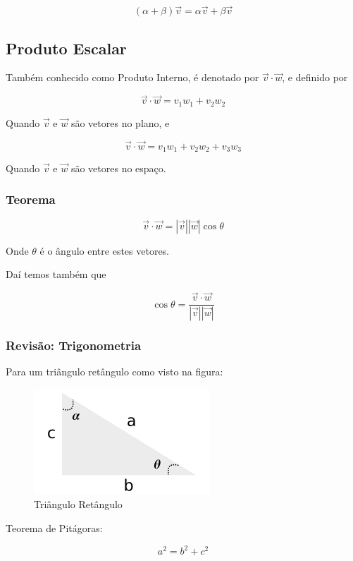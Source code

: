\[
(\alpha + \beta) \vec{v} = \alpha \vec{v} + \beta \vec{v}
\]

\subsection{Produto Escalar}\label{produto-escalar}

Também conhecido como Produto Interno, é denotado por
$\vec{v} \cdot \vec{w}$, e definido por

\[
\vec{v} \cdot \vec{w} = v_1 w_1 + v_2 w_2
\]

Quando $\vec{v}$ e $\vec{w}$ são vetores no plano, e

\[
\vec{v} \cdot \vec{w} = v_1 w_1 + v_2 w_2 + v_3 w_3
\]

Quando $\vec{v}$ e $\vec{w}$ são vetores no espaço.

\subsubsection{Teorema}\label{teorema}

\[
\vec{v} \cdot \vec{w} = |\vec{v}| |\vec{w}| \cos \theta
\]

Onde $\theta$ é o ângulo entre estes vetores.

Daí temos também que

\[
\cos \theta = \frac{\vec{v} \cdot \vec{w}}{|\vec{v}| |\vec{w}|}
\]

\subsubsection{Revisão: Trigonometria}\label{revisuxe3o-trigonometria}

Para um triângulo retângulo como visto na figura:

\begin{figure}[htbp]
\centering
\includegraphics{img/triangulo-retangulo.jpg}
\caption{Triângulo Retângulo}
\end{figure}

Teorema de Pitágoras:

\[
a^2 = b^2 + c^2
\]

